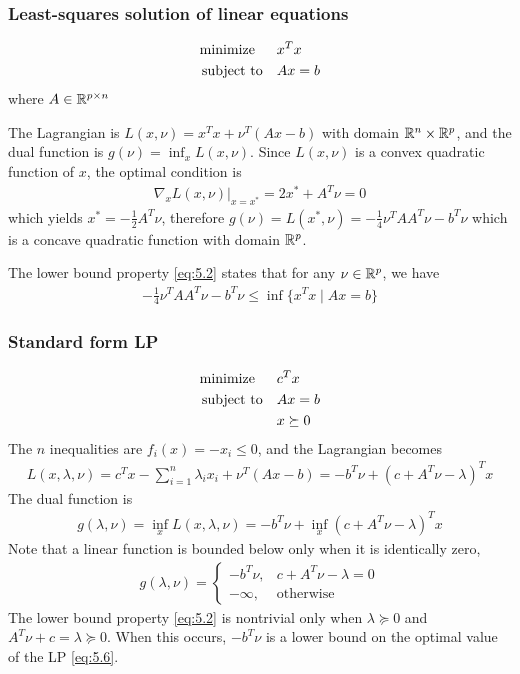 \subsubsection{Least-squares solution of linear equations}
\begin{align}
  \text{minimize\;\;}\quad& x^Tx\nonumber\\
  \text{subject to}  \quad& Ax=b\label{eq:5.5}
\end{align}
where $A\in\mathbb{R}^{p\times n}$\par
The Lagrangian is $L(x,\nu)=x^Tx+\nu^T(Ax-b)$ with domain $\mathbb{R}^n\times\mathbb{R}^p$, and the dual function is $g(\nu)=\inf_x{L(x,\nu)}$.
Since $L(x,\nu)$ is a convex quadratic function of $x$, the optimal condition is
\begin{align*}
  \nabla_xL(x,\nu)|_{x=x^\ast}=2x^\ast+A^T\nu=0
\end{align*}
which yields $x^\ast=-\frac{1}{2}A^T\nu$, therefore $g(\nu)=L(x^\ast,\nu)=-\frac{1}{4}\nu^TAA^T\nu-b^T\nu$ which is a concave quadratic function with domain $\mathbb{R}^p$.\par
The lower bound property \eqref{eq:5.2} states that for any $\nu\in\mathbb{R}^p$, we have
\begin{align*}
  -\frac{1}{4}\nu^TAA^T\nu-b^T\nu\le\inf\{x^Tx\mid Ax=b\}
\end{align*}

\subsubsection{Standard form LP}
\begin{align}
  \text{minimize\;\;}\quad& c^Tx\nonumber\\
  \text{subject to}  \quad& Ax=b\label{eq:5.6}\\
                          & x\succeq 0\nonumber
\end{align}
The $n$ inequalities are $f_i(x)=-x_i\le 0$, and the Lagrangian becomes
\begin{align*}
  L(x,\lambda,\nu)=c^Tx-\sum_{i=1}^n\lambda_ix_i+\nu^T(Ax-b)=-b^T\nu+(c+A^T\nu-\lambda)^Tx
\end{align*}
The dual function is
\begin{align*}
  g(\lambda,\nu)=\inf_xL(x,\lambda,\nu)=-b^T\nu+\inf_x(c+A^T\nu-\lambda)^Tx
\end{align*}
Note that a linear function is bounded below only when it is identically zero, \ie
\begin{align*}
  g(\lambda,\nu)=
  \begin{cases}
    -b^T\nu, &c+A^T\nu-\lambda=0\\
    -\infty, &\text{otherwise}
  \end{cases}
\end{align*}
The lower bound property \eqref{eq:5.2} is nontrivial only when $\lambda\succeq 0$ and $A^T\nu+c=\lambda\succeq 0$.
When this occurs, $-b^T\nu$ is a lower bound on the optimal value of the LP \eqref{eq:5.6}.

